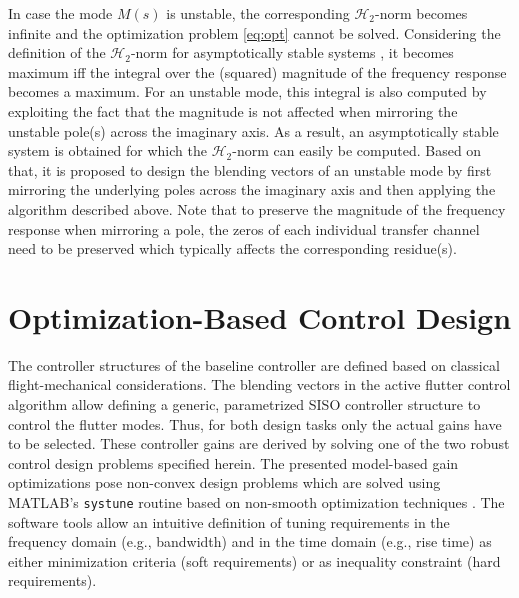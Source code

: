 \documentclass[aerospace,article,submit,moreauthors,pdftex,10pt,a4paper]{Definitions/mdpi}
\begin{document}
In case the mode $M(s)$ is unstable, the corresponding $\mathcal{H}_2$-norm becomes infinite and the optimization problem \eqref{eq:opt} cannot be solved. Considering the definition of the $\mathcal{H}_2$-norm for asymptotically stable systems \cite{Skoge_05}, it becomes maximum iff the integral over the (squared) magnitude of the frequency response becomes a maximum. For an unstable mode, this integral is also computed by exploiting the fact that  the magnitude is not affected when mirroring the unstable pole(s) across the imaginary axis. As a result, an asymptotically stable system is obtained for which the $\mathcal{H}_2$-norm can easily be computed. 
Based on that, it is proposed to design the blending vectors of an unstable mode by first mirroring the underlying poles across the imaginary axis and then applying the algorithm described above. Note that  to preserve the magnitude of the frequency response when mirroring a pole, the zeros of each individual transfer channel need to be preserved which typically affects the corresponding residue(s).


\section{Optimization-Based Control Design}\label{sec:opt}
The controller structures of the baseline controller are defined based on classical flight-mechanical considerations. The blending vectors in the active flutter control algorithm allow defining a generic, parametrized SISO controller structure to control the flutter modes. Thus, for both design tasks only the actual gains have to be selected. 
These controller gains are derived by solving one of the two  robust control design problems specified herein. The presented  model-based gain optimizations pose non-convex design problems which are solved  using MATLAB's \texttt{systune} routine based on non-smooth optimization techniques \cite{Apkarian06}.
The software tools allow an intuitive definition of tuning requirements in the frequency domain (e.g., bandwidth) and in the time domain (e.g., rise time)  as either minimization criteria (soft requirements) or as inequality constraint (hard requirements).
\end{document}
